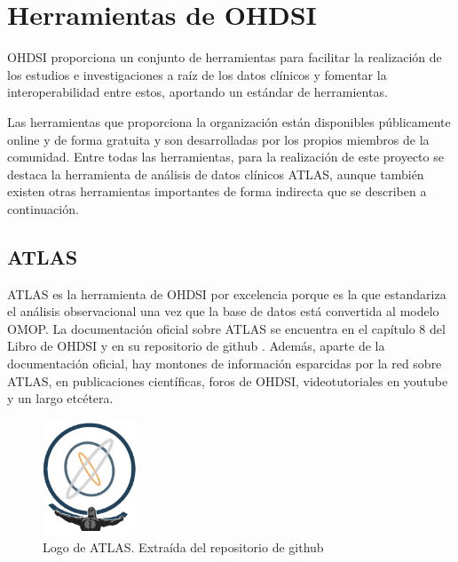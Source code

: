 
\section{Herramientas de OHDSI} \label{sec:07herramientas}

OHDSI proporciona un conjunto de herramientas para facilitar la realización de los estudios e investigaciones a raíz de los datos clínicos y fomentar la interoperabilidad entre estos, aportando un estándar de herramientas. 

Las herramientas que proporciona la organización están disponibles públicamente online y de forma gratuita y son desarrolladas por los propios miembros de la comunidad. Entre todas las herramientas, para la realización de este proyecto se destaca la herramienta de análisis de datos clínicos ATLAS, aunque también existen otras herramientas importantes de forma indirecta que se describen a continuación.

\subsection{ATLAS} \label{subsec:07ATLAS}

ATLAS es la herramienta de OHDSI por excelencia porque es la que estandariza el análisis observacional una vez que la base de datos está convertida al modelo OMOP. La documentación oficial sobre ATLAS se encuentra en el capítulo 8 del Libro de OHDSI y en su repositorio de github \cite{githubATLAS}. Además, aparte de la documentación oficial, hay montones de información esparcidas por la red sobre ATLAS, en publicaciones científicas, foros de OHDSI, videotutoriales en youtube y un largo etcétera.

\begin{figure}[H]
\centering
\includegraphics[width=0.25\textwidth]{figures/ATLASlogo.png}
     \caption{Logo de ATLAS. Extraída del repositorio de github \cite{githubATLAS}}
    \label{fig:ATLASlogo}
\end{figure}


